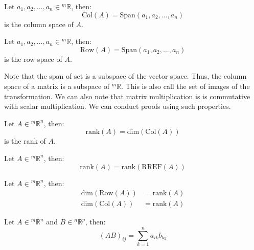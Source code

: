 \documentclass[11pt]{report}
\begin{document}
\begin{definition}
    Let $a_1, a_2, \ldots, {a_n} \in {^m\mathbb{R}}$, then:   
    \begin{equation}
        \text{Col}(A) = \text{Span}({a_1}, {a_2}, \ldots, {a_n})
    \end{equation}
    is the column space of $A$.
\end{definition}
\begin{definition}
    Let $a_1, a_2, \ldots, {a_n} \in {^m\mathbb{R}}$, then:   
    \begin{equation}
        \text{Row}(A) = \text{Span}({a_1}, {a_2}, \ldots, {a_n})
    \end{equation}
    is the row space of $A$.
\end{definition}
Note that the span of set is a subspace of the vector space. Thus, the column space of a matrix is a subspace of $^m\mathbb{R}$. This is also call the set of images of the transformation. We can also note that matrix multiplication is is commutative with scalar multiplication. We can conduct proofs using such properties.
\begin{definition}[Rank]
    Let $A \in {^m\mathbb{R}^n}$, then:
    \begin{equation}
        \text{rank}(A) = \text{dim}(\text{Col}(A))
    \end{equation}
    is the rank of $A$.
\end{definition}
\begin{theorem}
    Let $A \in {^m\mathbb{R}^n}$, then:
    \begin{equation}
        \text{rank}(A) = \text{rank}(\text{RREF}(A))
    \end{equation}
\end{theorem}
\begin{theorem}
    Let $A \in {^m\mathbb{R}^n}$, then:
    \begin{align}
        \text{dim}(\text{Row}(A)) &= \text{rank}(A) \\
        \text{dim}(\text{Col}(A)) &= \text{rank}(A)
    \end{align}
\end{theorem}
\begin{definition}
    Let $A \in {^m\mathbb{R}^n}$ and $B \in {^n\mathbb{R}^p}$, then:
    \begin{equation}
        (AB)_{ij} = \sum_{k=1}^{n} a_{ik}b_{kj}
    \end{equation}
\end{definition}
\end{document}
